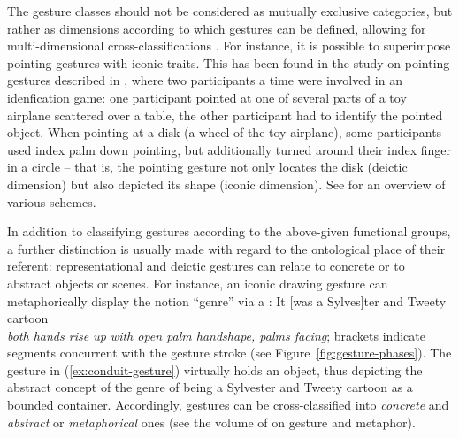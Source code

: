 \documentclass[output=paper]{langsci/langscibook}
\begin{document}
The gesture classes should not be considered as mutually exclusive categories, but rather as dimensions according to which gestures can be defined, allowing for multi-dimensional cross-classifications \citep{McNeill:2005,Gerwing:Bavelas:2004}.
%
For instance, it is possible to superimpose pointing gestures with iconic traits.
%
This has been found in the study on pointing gestures described in \citet{Kranstedt:Luecking:Pfeiffer:Rieser:Wachsmuth:2006:b}, where two participants a time were involved in an idenfication game: one participant pointed at one of several parts of a toy airplane scattered over a table, the other participant had to identify the pointed object.
%
When pointing at a disk (a wheel of the toy airplane), some participants used index palm down pointing, but additionally turned around their index finger in a circle -- that is, the pointing gesture not only locates the disk (deictic dimension) but also depicted its shape (iconic dimension). %
%
See \citet{Ozyurek:2012} for an overview of various  schemes.



In addition to classifying gestures according to the above-given functional groups, a further distinction is usually made with regard to the ontological place of their referent: representational and deictic gestures can relate to concrete or to abstract objects or scenes. 
%
For instance, an iconic drawing gesture can metaphorically display the notion \enquote{genre} via a  \citep[]{McNeill:1992}:
%
\ea \label{ex:conduit-gesture}
It [was a Sylves]ter and Tweety cartoon \\
\textit{both hands rise up with open palm handshape, palms facing}; brackets indicate segments concurrent with the gesture stroke (see Figure~\ref{fig:gesture-phases}). 
\z 
%
The gesture in (\ref{ex:conduit-gesture}) virtually holds an object, thus depicting the abstract concept of the genre of being a Sylvester and Tweety cartoon as a bounded container.
%
Accordingly, gestures can be cross-classified into \emph{concrete} and \emph{abstract} or \emph{metaphorical}   ones (see the volume of \citet{Cienki:Mueller:2008} on gesture and metaphor).
\end{document}
